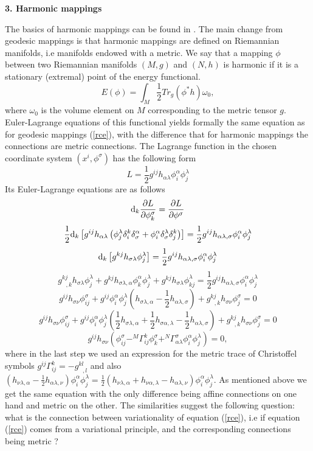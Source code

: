 \documentclass[english]{article}
\begin{document}
\begin{center}
{\bf 3. Harmonic mappings}
\end{center}
The basics of harmonic mappings can be found in \cite{ura}. The main change from geodesic mappings is that harmonic mappings are defined on Riemannian manifolds, i.e manifolds endowed with a metric. We say that a mapping $\phi$ between two Riemannian manifolds $(M,g)$ and $(N,h)$ is harmonic if it is a stationary (extremal) point of the energy functional.
$$
E(\phi)=\int_M \frac{1}{2}Tr_g(\phi^* h) \omega_0,
$$
where $\omega_0$ is the volume element on $M$ corresponding to the metric tensor $g$. Euler-Lagrange equations of this functional yields formally the same equation as for geodesic mappings (\ref{rce}), with the difference that for harmonic mappings the connections are metric connections.
The Lagrange function in the chosen coordinate system $(x^i,\phi^\sigma)$ has the following form
$$
L=\frac{1}{2}g^{ij}h_{\alpha\lambda}\phi^\alpha_i\phi^\lambda_j
$$
Its Euler-Lagrange equations are as follows
$$
{\rm d}_k\frac{\partial L}{\partial \phi^\sigma_k}=\frac{\partial L}{\partial \phi^\sigma}
$$
$$
\frac{1}{2}{\rm d}_k\left[g^{ij}h_{\alpha\lambda}\left(\phi^\lambda_j\delta^k_i\delta^\alpha_\sigma+\phi^\alpha_i\delta^\lambda_\sigma\delta^k_j\right)\right]=\frac{1}{2}g^{ij}h_{\alpha\lambda,\sigma}\phi^\alpha_i\phi^\lambda_j
$$
$$
{\rm d}_k\left[g^{kj}h_{\sigma\lambda}\phi^\lambda_j\right]=\frac{1}{2}g^{ij}h_{\alpha\lambda,\sigma}\phi^\alpha_i\phi^\lambda_j
$$
$$
g^{kj}_{\,\,\,\,,k}h_{\sigma\lambda}\phi^\lambda_j+g^{kj}h_{\sigma\lambda,\alpha}\phi^\alpha_k\phi^\lambda_j+g^{kj}h_{\sigma\lambda}\phi^\lambda_{kj}=\frac{1}{2}g^{ij}h_{\alpha\lambda,\sigma}\phi^\alpha_i\phi^\lambda_j
$$
$$
g^{ij}h_{\sigma\nu}\phi^\sigma_{ij}+g^{ij}\phi^\alpha_i\phi^\lambda_j\left(h_{\sigma\lambda,\alpha}-\frac{1}{2}h_{\alpha\lambda,\sigma}\right)+g^{kj}_{\,\,\,\,,k}h_{\sigma\nu}\phi^\sigma_j=0
$$
$$
g^{ij}h_{\sigma\nu}\phi^\sigma_{ij}+g^{ij}\phi^\alpha_i\phi^\lambda_j\left(\frac{1}{2}h_{\sigma\lambda,\alpha}+\frac{1}{2}h_{\sigma\alpha,\lambda}-\frac{1}{2}h_{\alpha\lambda,\sigma}\right)+g^{kj}_{\,\,\,\,,k}h_{\sigma\nu}\phi^\sigma_j=0
$$
$$
g^{ij}h_{\sigma\nu}\left(\phi^\sigma_{ij}-^M\Gamma^k_{ij}\phi^\sigma_k+^N\Gamma^\sigma_{\alpha\lambda}\phi^\alpha_i\phi^\lambda_j\right)=0,
$$
where in the last step we used an expression for the metric trace of Christoffel symbols $g^{ij}\Gamma^k_{ij}=-g^{kl}_{\,\,\,\,,l}$ and also $(h_{\nu\lambda,\alpha}-\frac{1}{2}h_{\alpha\lambda,\nu})\phi^\alpha_i\phi^\lambda_j=
\frac{1}{2}(h_{\nu\lambda,\alpha}+h_{\nu\alpha,\lambda}-h_{\alpha\lambda,\nu})\phi^\alpha_i\phi^\lambda_j$. As mentioned above we get the same equation with the only difference being affine connections on one hand and metric on the other. The similarities suggest the following question: what is the connection between variationality of equation (\ref{rce}), i.e if equation (\ref{rce}) comes from a variational principle, and the corresponding connections being metric ?
\end{document}
